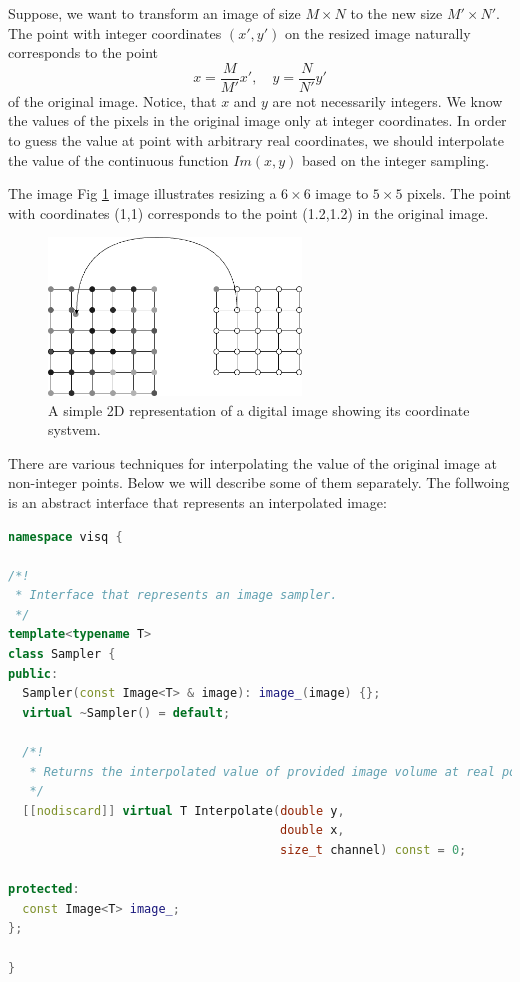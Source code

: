 \documentclass[11pt]{book}
\begin{document}
Suppose, we want to transform an image of size $M\times N$ to the new size $M'\times N'$. The point with integer coordinates $(x',y')$ on the resized image naturally corresponds to the point 
\begin{equation}
	x = \frac{M}{M'} x',\quad y=\frac{N}{N'}y'
\end{equation} 
of the original image. Notice, that $x$ and $y$ are not necessarily integers. We know the values of the pixels in the original image only at integer coordinates. In order to guess the value at point with arbitrary real coordinates, we should interpolate the value of the continuous function $Im(x,y)$ based on the integer sampling.
 
The image Fig \ref{fig:resize} image illustrates resizing a $6\times 6$ image to $5\times 5$ pixels. The point with coordinates (1,1) corresponds to the point (1.2,1.2) in the original image. 


\begin{figure}[h]
\centering
\includegraphics[width=0.6\textwidth]{images/resampling.drawio.png}
\caption{A simple 2D representation of a digital image showing its coordinate systvem.}
\label{fig:resize}
\end{figure}

There are various techniques for interpolating the value of the original image at non-integer points. Below we will describe some of them separately. The follwoing is an abstract interface that represents an interpolated image:


\begin{lstlisting}[language=C++, caption={The interface for image sampler}]
namespace visq {

/*!
 * Interface that represents an image sampler.
 */
template<typename T>
class Sampler {
public:
  Sampler(const Image<T> & image): image_(image) {};
  virtual ~Sampler() = default;

  /*!
   * Returns the interpolated value of provided image volume at real point (x,y, channel)
   */
  [[nodiscard]] virtual T Interpolate(double y, 
                                      double x,
                                      size_t channel) const = 0;

protected:
  const Image<T> image_;
};

}
\end{lstlisting}
\end{document}

